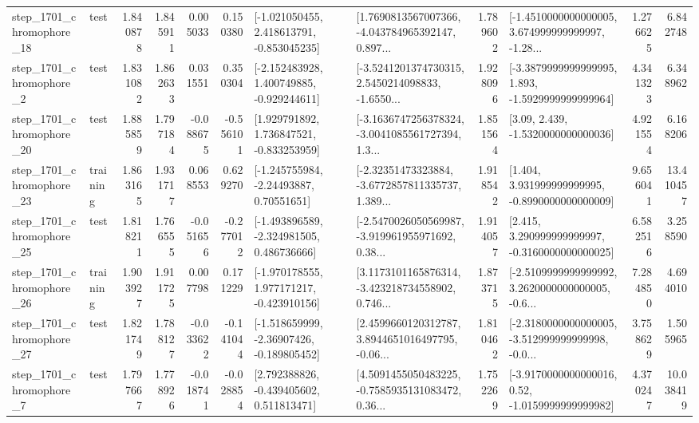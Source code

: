 \begin{tabular}{llrrrrllrlrr}
 step\_1701\_chromophore\_18 &      test &      1.840878 &    1.845911 &      0.005033 &  0.150380 &   [-1.021050455, 2.418613791, -0.853045235] &  [1.7690813567007366, -4.043784965392147, 0.897... &       1.789602 &  [-1.4510000000000005, 3.674999999999997, -1.28... &            1.276625 &          6.842748 \\
  step\_1701\_chromophore\_2 &      test &      1.831082 &    1.862633 &      0.031551 &  0.350304 &   [-2.152483928, 1.400749885, -0.929244611] &  [-3.5241201374730315, 2.5450214098833, -1.6550... &       1.928096 &  [-3.3879999999999995, 1.893, -1.5929999999999964] &            4.341323 &          6.348962 \\
 step\_1701\_chromophore\_20 &      test &      1.885859 &    1.797184 &     -0.088675 & -0.556101 &    [1.929791892, 1.736847521, -0.833253959] &  [-3.1636747256378324, -3.0041085561727394, 1.3... &       1.851564 &                 [3.09, 2.439, -1.5320000000000036] &            4.921554 &          6.168206 \\
 step\_1701\_chromophore\_23 &  training &      1.863165 &    1.931717 &      0.068553 &  0.629270 &     [-1.245755984, -2.24493887, 0.70551651] &  [-2.32351473323884, -3.6772857811335737, 1.389... &       1.918542 &    [1.404, 3.931999999999995, -0.8990000000000009] &            9.656041 &         13.410457 \\
 step\_1701\_chromophore\_25 &      test &      1.818211 &    1.766555 &     -0.051656 & -0.277012 &   [-1.493896589, -2.324981505, 0.486736666] &  [-2.5470026050569987, -3.919961955971692, 0.38... &       1.914057 &    [2.415, 3.290999999999997, -0.3160000000000025] &            6.582516 &          3.258590 \\
 step\_1701\_chromophore\_26 &  training &      1.903927 &    1.911725 &      0.007798 &  0.171229 &   [-1.970178555, 1.977171217, -0.423910156] &  [3.1173101165876314, -3.423218734558902, 0.746... &       1.873715 &  [-2.5109999999999992, 3.2620000000000005, -0.6... &            7.284850 &          4.694010 \\
 step\_1701\_chromophore\_27 &      test &      1.821749 &    1.788127 &     -0.033622 & -0.141044 &   [-1.518659999, -2.36907426, -0.189805452] &  [2.4599660120312787, 3.8944651016497795, -0.06... &       1.810462 &  [-2.3180000000000005, -3.512999999999998, -0.0... &            3.758629 &          1.505965 \\
  step\_1701\_chromophore\_7 &      test &      1.797667 &    1.778926 &     -0.018741 & -0.028854 &    [2.792388826, -0.439405602, 0.511813471] &  [4.5091455050483225, -0.7585935131083472, 0.36... &       1.752269 &   [-3.9170000000000016, 0.52, -1.0159999999999982] &            4.370247 &         10.038419 \\

\end{tabular}
